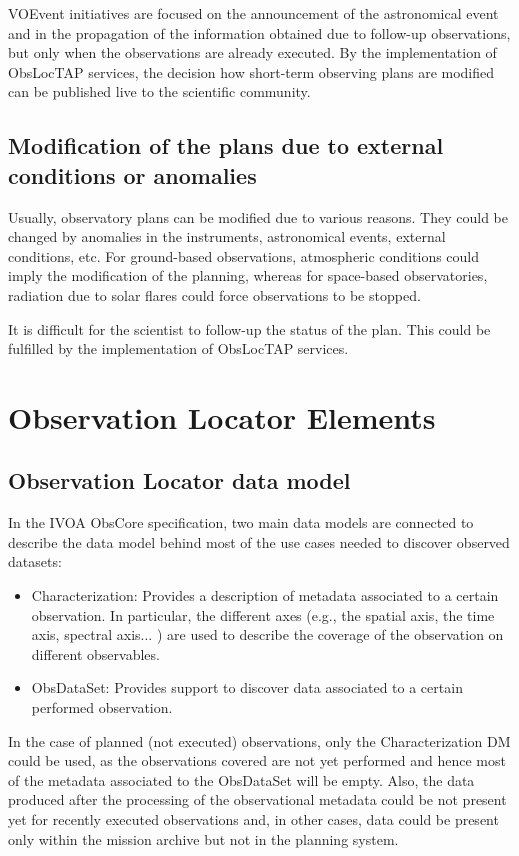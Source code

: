 \documentclass[11pt,a4paper]{ivoa}
\begin{document}
VOEvent initiatives are focused on the announcement of the astronomical event and in the propagation of the information obtained due to follow-up observations, but only when the observations are already executed. By the implementation of ObsLocTAP services, the decision how short-term observing plans are modified can be published live to the scientific community.

\subsection{Modification of the plans due to external conditions or anomalies}
Usually, observatory plans can be modified due to various reasons. They could be changed by anomalies in the instruments, astronomical events, external conditions, etc. For ground-based observations, atmospheric conditions could imply the modification of the planning, whereas for space-based observatories, radiation due to solar flares could force observations to be stopped.

It is difficult for the scientist to follow-up the status of the plan. This could be fulfilled by the implementation of ObsLocTAP services.

\section{Observation Locator Elements}
\subsection{Observation Locator data model }
In the IVOA ObsCore specification, two main data models are connected to describe the data model behind most of the use cases needed to discover observed datasets:

\begin{itemize}
	\item Characterization: Provides a description of metadata associated to a certain observation. In particular, the different axes (e.g., the spatial axis, the time axis, spectral axis$ \ldots $ ) are used to describe the coverage of the observation on different observables.
	\item ObsDataSet: Provides support to discover data associated to a certain performed observation.
\end{itemize}

In the case of planned (not executed) observations, only the Characterization DM could be used, as the observations covered are not yet performed and hence most of the metadata associated to the ObsDataSet will be empty. Also, the data produced after the processing of the observational metadata could be not present yet for recently executed observations and, in other cases, data could be present only within the mission archive but not in the planning system. 
\end{document}
